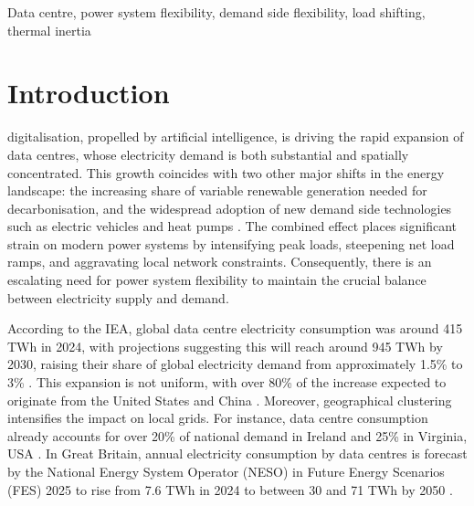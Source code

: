 \documentclass[lettersize,journal]{IEEEtran}
\begin{document}
\begin{IEEEkeywords}
Data centre, power system flexibility, demand side flexibility, load shifting, thermal inertia
\end{IEEEkeywords}

\section{Introduction}

 digitalisation, propelled by artificial intelligence, is driving the rapid expansion of data centres, whose electricity demand is both substantial and spatially concentrated. This growth coincides with two other major shifts in the energy landscape: the increasing share of variable renewable generation needed for decarbonisation, and the widespread adoption of new demand side technologies such as electric vehicles and heat pumps \cite{Centrica2020LEM, EEAACER2023Flex}. The combined effect places significant strain on modern power systems by intensifying peak loads, steepening net load ramps, and aggravating local network constraints. Consequently, there is an escalating need for power system flexibility to maintain the crucial balance between electricity supply and demand.

According to the IEA, global data centre electricity consumption was around 415 TWh in 2024, with projections suggesting this will reach around 945 TWh by 2030, raising their share of global electricity demand from approximately 1.5\% to 3\% \cite{iea_energy_ai}. This expansion is not uniform, with over 80\% of the increase expected to originate from the United States and China \cite{iea_energy_ai}. Moreover, geographical clustering intensifies the impact on local grids. For instance, data centre consumption already accounts for over 20\% of national demand in Ireland and 25\% in Virginia, USA \cite{iea_energy_ai}. In Great Britain, annual electricity consumption by data centres is forecast by the National Energy System Operator (NESO) in Future Energy Scenarios (FES) 2025 to rise from 7.6 TWh in 2024 to between 30 and 71 TWh by 2050 \cite{neso2025future}.
\end{document}
